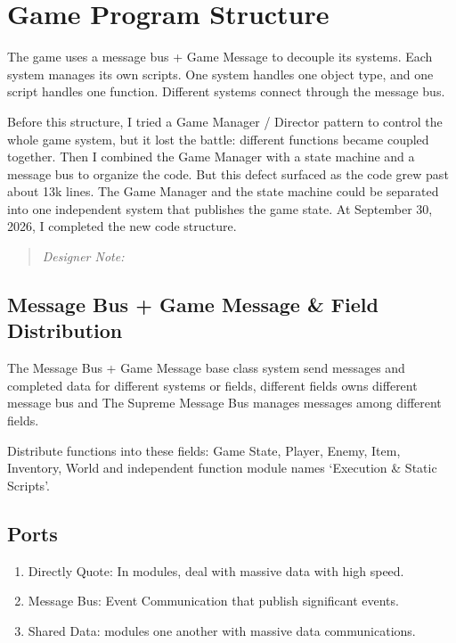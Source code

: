 \section{Game Program Structure}

The game uses a message bus + Game Message to decouple its systems. Each system manages its own scripts. One system handles one object type, and one script handles one function. Different systems connect through the message bus.

Before this structure, I tried a Game Manager / Director pattern to control the whole game system, but it lost the battle: different functions became coupled together. Then I combined the Game Manager with a state machine and a message bus to organize the code. But this defect surfaced as the code grew past about 13k lines. The Game Manager and the state machine could be separated into one independent system that publishes the game state. At September 30, 2026, I completed the new code structure.

\begin{quote}
\emph{Designer Note:}
\end{quote}

\subsection{Message Bus + Game Message \& Field Distribution}

The Message Bus + Game Message base class system send messages and completed data for different systems or fields, different fields owns different message bus and The Supreme Message Bus manages messages among different fields.

Distribute functions into these fields: Game State, Player, Enemy, Item, Inventory, World and independent function module names `Execution \& Static Scripts'.

\subsection{Ports}

\begin{enumerate}
  \item Directly Quote: In modules, deal with massive data with high speed.
  \item Message Bus: Event Communication that publish significant events.
  \item Shared Data: modules one another with massive data communications.
\end{enumerate}

